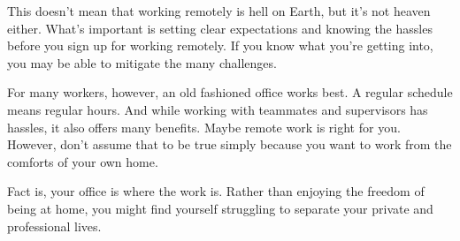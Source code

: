 \documentclass{main}
\begin{document}
This doesn't mean that working remotely is hell on Earth, but it's not heaven
either. What's important is setting clear expectations and knowing the hassles
before you sign up for working remotely. If you know what you're getting into,
you may be able to mitigate the many challenges.

For many workers, however, an old fashioned office works best. A regular
schedule means regular hours. And while working with teammates and supervisors
has hassles, it also offers many benefits. Maybe remote work is right for you.
However, don't assume that to be true simply because you want to work from the
comforts of your own home.

Fact is, your office is where the work is. Rather than enjoying the freedom of
being at home, you might find yourself struggling to separate your private and
professional lives.
\end{document}
